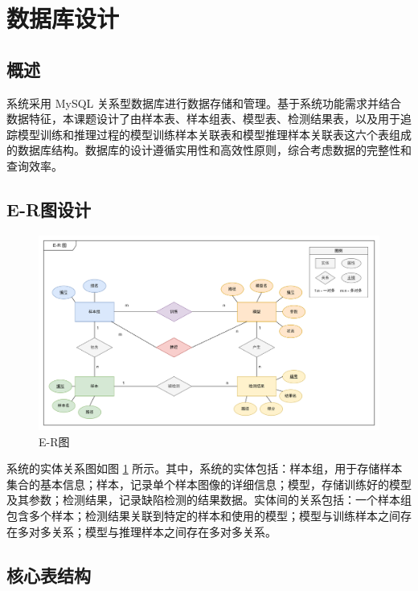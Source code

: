 \documentclass[
  ]{njuthesis}
\begin{document}
\section{数据库设计}

\subsection{概述}

系统采用 MySQL 关系型数据库进行数据存储和管理。基于系统功能需求并结合数据特征，本课题设计了由样本表、样本组表、模型表、检测结果表，以及用于追踪模型训练和推理过程的模型训练样本关联表和模型推理样本关联表这六个表组成的数据库结构。数据库的设计遵循实用性和高效性原则，综合考虑数据的完整性和查询效率。

\subsection{E-R图设计}

\begin{figure}[H]
    \centering
    \includegraphics[width=\textwidth]{images/E-R图.png}
    \caption{E-R图}
    \label{E-R图}
\end{figure}

系统的实体关系图如图 \ref{E-R图} 所示。其中，系统的实体包括：样本组，用于存储样本集合的基本信息；样本，记录单个样本图像的详细信息；模型，存储训练好的模型及其参数；检测结果，记录缺陷检测的结果数据。实体间的关系包括：一个样本组包含多个样本；检测结果关联到特定的样本和使用的模型；模型与训练样本之间存在多对多关系；模型与推理样本之间存在多对多关系。

\subsection{核心表结构}
\end{document}

